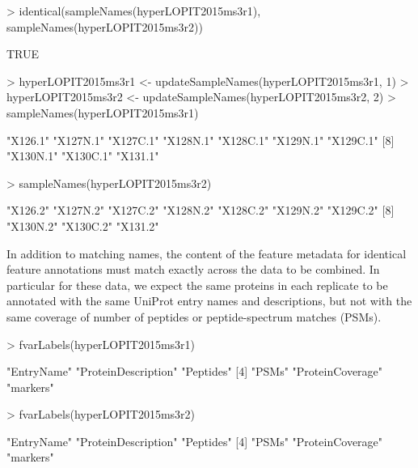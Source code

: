 \begin{Schunk}
\begin{Sinput}
> identical(sampleNames(hyperLOPIT2015ms3r1), sampleNames(hyperLOPIT2015ms3r2))
\end{Sinput}
\begin{Soutput}
[1] TRUE
\end{Soutput}
\begin{Sinput}
> hyperLOPIT2015ms3r1 <- updateSampleNames(hyperLOPIT2015ms3r1, 1)
> hyperLOPIT2015ms3r2 <- updateSampleNames(hyperLOPIT2015ms3r2, 2)
> sampleNames(hyperLOPIT2015ms3r1)
\end{Sinput}
\begin{Soutput}
 [1] "X126.1"  "X127N.1" "X127C.1" "X128N.1" "X128C.1" "X129N.1" "X129C.1"
 [8] "X130N.1" "X130C.1" "X131.1" 
\end{Soutput}
\begin{Sinput}
> sampleNames(hyperLOPIT2015ms3r2)
\end{Sinput}
\begin{Soutput}
 [1] "X126.2"  "X127N.2" "X127C.2" "X128N.2" "X128C.2" "X129N.2" "X129C.2"
 [8] "X130N.2" "X130C.2" "X131.2" 
\end{Soutput}
\end{Schunk}

In addition to matching names, the content of the feature metadata for
identical feature annotations must match exactly across the data to be
combined. In particular for these data, we expect the same proteins in
each replicate to be annotated with the same UniProt entry names and
descriptions, but not with the same coverage of number of peptides or
peptide-spectrum matches (PSMs).

\begin{Schunk}
\begin{Sinput}
> fvarLabels(hyperLOPIT2015ms3r1)
\end{Sinput}
\begin{Soutput}
[1] "EntryName"          "ProteinDescription" "Peptides"          
[4] "PSMs"               "ProteinCoverage"    "markers"           
\end{Soutput}
\begin{Sinput}
> fvarLabels(hyperLOPIT2015ms3r2)
\end{Sinput}
\begin{Soutput}
[1] "EntryName"          "ProteinDescription" "Peptides"          
[4] "PSMs"               "ProteinCoverage"    "markers"           
\end{Soutput}
\end{Schunk}

